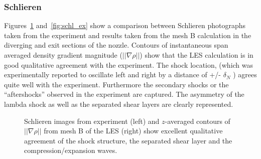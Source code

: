 \documentclass[]{aiaa-tc}%
\begin{document}

\subsubsection{Schlieren}


Figures~\ref{fig:schl} and~\ref{fig:schl_ex} show a comparison between Schlieren photographs taken from the experiment and results taken from the mesh B calculation in the diverging and exit sections of the nozzle.  Contours of instantaneous span averaged density gradient magnitude ($||\nabla\rho|| $) show that the LES calculation is in good qualitative agreement with the experiment.  The shock location, (which was experimentally reported to oscillate left and right by a distance of +/- $\delta_N$ ) agrees quite well with the experiment.  Furthermore the secondary shocks or the ``aftershocks'' observed in the experiment are captured.  The asymmetry of the lambda shock as well as the separated shear layers are clearly represented.



\begin{figure}[!h]%
	\begin{center}
	\end{center}
 	\caption{Schlieren images from experiment \cite{Papam:10} (left) and $z$-averaged contours of $||\nabla\rho||$ from mesh B of the LES (right) show excellent qualitative agreement of the shock structure, the separated shear layer and the compression/expansion waves.  }
 	\label{fig:schl}
\end{figure}
\end{document}
